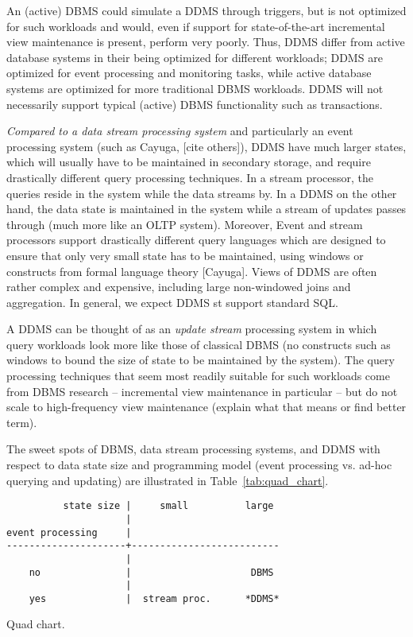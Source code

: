 An (active) DBMS could simulate a DDMS through triggers, but is not optimized for such workloads and would, even if support for state-of-the-art incremental view maintenance is present, perform very poorly. Thus, DDMS differ from active database systems in their being optimized for different workloads; DDMS are optimized for event processing and monitoring tasks, while active database systems are optimized for more traditional DBMS workloads. DDMS will not necessarily support typical (active) DBMS functionality such as transactions.

{\em Compared to a data stream processing system}\/
and particularly an event processing system (such as Cayuga, [cite others]),
%
DDMS have much larger states, which will usually have to be maintained in secondary storage, and require drastically different query processing techniques.
In a stream processor, the queries reside in the system while the data streams by. In a DDMS on the other hand, the data state is maintained in the system while a stream of updates passes through (much more like an OLTP system).
%
Moreover, Event and stream processors support drastically different query languages which are designed to ensure that only very small state has to be maintained, using windows or constructs from formal language theory [Cayuga].  Views of DDMS are often rather complex and expensive, including large non-windowed joins and aggregation. In general, we expect DDMS st support standard SQL.

A DDMS can be thought of as an {\em update stream}\/ processing system in which query workloads look more like those of classical DBMS (no constructs such as windows to bound the size of state to be maintained by the system). The query processing techniques that seem most readily suitable for such workloads come from DBMS research -- incremental view maintenance in particular -- but do not scale to high-frequency view maintenance (explain what that means or find better term).

\smallskip

The sweet spots of DBMS, data stream processing systems, and DDMS with
respect to data state size and programming model (event processing vs. ad-hoc querying and updating) are illustrated in Table~\ref{tab:quad_chart}.


\begin{table}
\begin{verbatim}
          state size |     small          large
                     |
event processing     |
---------------------+--------------------------
                     |
    no               |                     DBMS
                     |
    yes              |  stream proc.      *DDMS*
\end{verbatim}
\caption{Quad chart.}
\label{tab:quad_chart}
\end{table}


